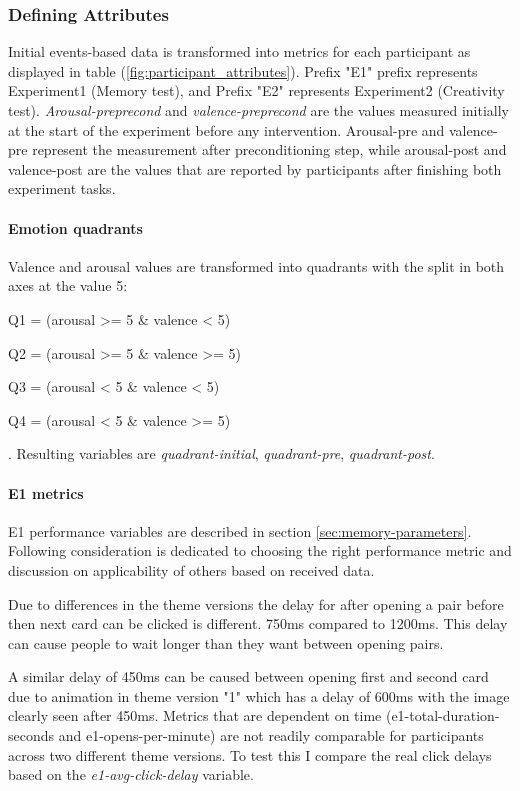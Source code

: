 	\subsubsection{Defining Attributes} Initial events-based data is transformed into metrics for each participant as displayed in table (\ref{fig:participant_attributes}). Prefix "E1" prefix represents Experiment1 (Memory test), and Prefix "E2" represents Experiment2 (Creativity test). \textit{Arousal-preprecond} and \textit{valence-preprecond} are the values measured initially at the start of the experiment before any intervention. Arousal-pre and valence-pre represent the measurement after preconditioning step, while arousal-post and valence-post are the values that are reported by participants after finishing both experiment tasks.

	\paragraph{Emotion quadrants}
	
	Valence and arousal values are transformed into quadrants with the split in both axes at the value 5:
	\begin{enumerate*}
		\item Q1 = (arousal >= 5 \& valence  < 5)
		\item Q2 = (arousal >= 5 \& valence  >= 5)
		\item Q3 = (arousal < 5 \& valence  < 5)
		\item Q4 = (arousal < 5 \& valence  >= 5)
	\end{enumerate*}. Resulting variables are \textit{quadrant-initial}, \textit{quadrant-pre}, \textit{quadrant-post}.
	
	\paragraph{E1 metrics}
	
	E1 performance variables are described in section \ref{sec:memory-parameters}. Following consideration is dedicated to choosing the right performance metric and discussion on applicability of others based on received data.
	
	Due to differences in the theme versions the delay for after opening a pair before then next card can be clicked is different. 750ms compared to 1200ms. This delay can cause people to wait longer than they want between opening pairs.
	
	A similar delay of 450ms can be caused between opening first and second card due to animation in theme version "1" which has a delay of 600ms with the image clearly seen after 450ms. Metrics that are dependent on time (e1-total-duration-seconds and e1-opens-per-minute) are not readily comparable for participants across two different theme versions. To test this I compare the real click delays based on the \textit{e1-avg-click-delay} variable.

